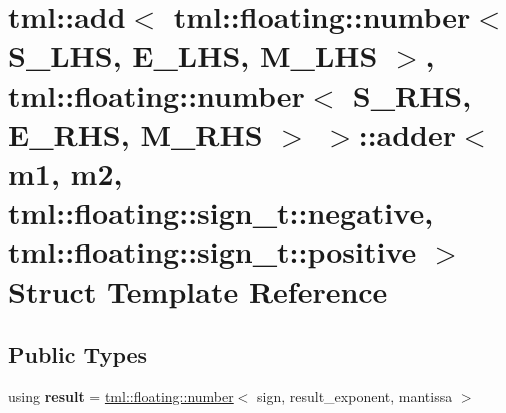 \hypertarget{structtml_1_1add_3_01tml_1_1floating_1_1number_3_01_s___l_h_s_00_01_e___l_h_s_00_01_m___l_h_s_01092b317c83488a1c5a1535bde017143b}{\section{tml\+:\+:add$<$ tml\+:\+:floating\+:\+:number$<$ S\+\_\+\+L\+H\+S, E\+\_\+\+L\+H\+S, M\+\_\+\+L\+H\+S $>$, tml\+:\+:floating\+:\+:number$<$ S\+\_\+\+R\+H\+S, E\+\_\+\+R\+H\+S, M\+\_\+\+R\+H\+S $>$ $>$\+:\+:adder$<$ m1, m2, tml\+:\+:floating\+:\+:sign\+\_\+t\+:\+:negative, tml\+:\+:floating\+:\+:sign\+\_\+t\+:\+:positive $>$ Struct Template Reference}
\label{structtml_1_1add_3_01tml_1_1floating_1_1number_3_01_s___l_h_s_00_01_e___l_h_s_00_01_m___l_h_s_01092b317c83488a1c5a1535bde017143b}
}
\subsection*{Public Types}
\begin{DoxyCompactItemize}
\item 
\hypertarget{structtml_1_1add_3_01tml_1_1floating_1_1number_3_01_s___l_h_s_00_01_e___l_h_s_00_01_m___l_h_s_01092b317c83488a1c5a1535bde017143b_a28553c41d3cdc437bf4ff98dc7257956}{using {\bfseries result} = \hyperlink{structtml_1_1floating_1_1number}{tml\+::floating\+::number}$<$ sign, result\+\_\+exponent, mantissa $>$}\label{structtml_1_1add_3_01tml_1_1floating_1_1number_3_01_s___l_h_s_00_01_e___l_h_s_00_01_m___l_h_s_01092b317c83488a1c5a1535bde017143b_a28553c41d3cdc437bf4ff98dc7257956}

\end{DoxyCompactItemize}
